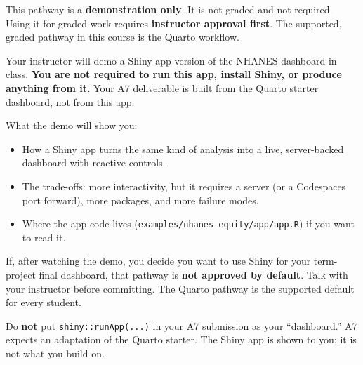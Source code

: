 \documentclass[
  letterpaper,
  DIV=11,
  numbers=noendperiod,
  oneside]{scrreprt}
\providecommand{\tightlist}{%
  \setlength{\itemsep}{0pt}\setlength{\parskip}{0pt}}
\begin{document}

\begin{tcolorbox}[enhanced jigsaw, title=\textcolor{quarto-callout-warning-color}{\faExclamationTriangle}\hspace{0.5em}{Demo only --- not graded}, arc=.35mm, toptitle=1mm, colframe=quarto-callout-warning-color-frame, toprule=.15mm, leftrule=.75mm, bottomtitle=1mm, opacityback=0, bottomrule=.15mm, coltitle=black, breakable, opacitybacktitle=0.6, titlerule=0mm, colback=white, left=2mm, colbacktitle=quarto-callout-warning-color!10!white, rightrule=.15mm]

This pathway is a \textbf{demonstration only}. It is not graded and not
required. Using it for graded work requires \textbf{instructor approval
first}. The supported, graded pathway in this course is the Quarto
workflow.

\end{tcolorbox}

Your instructor will demo a Shiny app version of the NHANES dashboard in
class. \textbf{You are not required to run this app, install Shiny, or
produce anything from it.} Your A7 deliverable is built from the Quarto
starter dashboard, not from this app.

What the demo will show you:

\begin{itemize}
\tightlist
\item
  How a Shiny app turns the same kind of analysis into a live,
  server-backed dashboard with reactive controls.
\item
  The trade-offs: more interactivity, but it requires a server (or a
  Codespaces port forward), more packages, and more failure modes.
\item
  Where the app code lives (\texttt{examples/nhanes-equity/app/app.R})
  if you want to read it.
\end{itemize}

If, after watching the demo, you decide you want to use Shiny for your
term-project final dashboard, that pathway is \textbf{not approved by
default}. Talk with your instructor before committing. The Quarto
pathway is the supported default for every student.

\begin{tcolorbox}[enhanced jigsaw, title=\textcolor{quarto-callout-warning-color}{\faExclamationTriangle}\hspace{0.5em}{Warning}, arc=.35mm, toptitle=1mm, colframe=quarto-callout-warning-color-frame, toprule=.15mm, leftrule=.75mm, bottomtitle=1mm, opacityback=0, bottomrule=.15mm, coltitle=black, breakable, opacitybacktitle=0.6, titlerule=0mm, colback=white, left=2mm, colbacktitle=quarto-callout-warning-color!10!white, rightrule=.15mm]

Do \textbf{not} put \texttt{shiny::runApp(...)} in your A7 submission as
your ``dashboard.'' A7 expects an adaptation of the Quarto starter. The
Shiny app is shown to you; it is not what you build on.

\end{tcolorbox}
\end{document}
